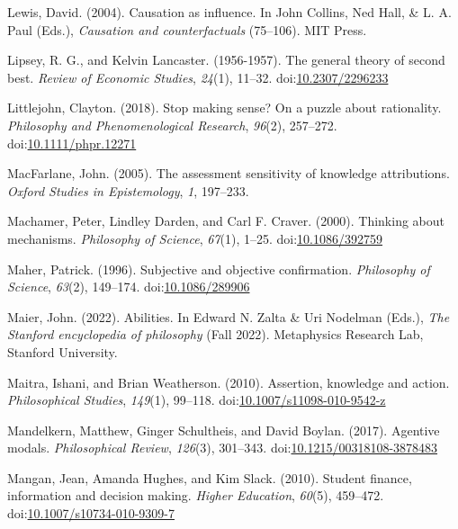 \documentclass[
  12pt,
  letterpaper,
]{scrbook}
\newlength{\cslhangindent}
\newenvironment{CSLReferences}[2] %
 {\begin{list}{}{%
  \setlength{\itemindent}{0pt}
  \setlength{\leftmargin}{0pt}
  \setlength{\parsep}{0pt}
  \ifodd #1
   \setlength{\leftmargin}{\cslhangindent}
   \setlength{\itemindent}{-1\cslhangindent}
  \fi
  \setlength{\itemsep}{#2\baselineskip}}}
 {\end{list}}
\begin{document}
\begin{CSLReferences}{1}{0}
Lewis, David. (2004). Causation as influence. In John Collins, Ned Hall,
\& L. A. Paul (Eds.), \emph{Causation and counterfactuals} (75--106).
{MIT} Press.

Lipsey, R. G., and Kelvin Lancaster. (1956-1957). The general theory of
second best. \emph{Review of Economic Studies}, \emph{24}(1), 11--32.
doi:\href{https://doi.org/10.2307/2296233}{10.2307/2296233}

Littlejohn, Clayton. (2018). Stop making sense? On a puzzle about
rationality. \emph{Philosophy and Phenomenological Research},
\emph{96}(2), 257--272.
doi:\href{https://doi.org/10.1111/phpr.12271}{10.1111/phpr.12271}

MacFarlane, John. (2005). The assessment sensitivity of knowledge
attributions. \emph{Oxford Studies in Epistemology}, \emph{1}, 197--233.

Machamer, Peter, Lindley Darden, and Carl F. Craver. (2000). Thinking
about mechanisms. \emph{Philosophy of Science}, \emph{67}(1), 1--25.
doi:\href{https://doi.org/10.1086/392759}{10.1086/392759}

Maher, Patrick. (1996). Subjective and objective confirmation.
\emph{Philosophy of Science}, \emph{63}(2), 149--174.
doi:\href{https://doi.org/10.1086/289906}{10.1086/289906}

Maier, John. (2022). {Abilities}. In Edward N. Zalta \& Uri Nodelman
(Eds.), \emph{The {Stanford} encyclopedia of philosophy} ({F}all 2022).
Metaphysics Research Lab, Stanford University.

Maitra, Ishani, and Brian Weatherson. (2010). Assertion, knowledge and
action. \emph{Philosophical Studies}, \emph{149}(1), 99--118.
doi:\href{https://doi.org/10.1007/s11098-010-9542-z}{10.1007/s11098-010-9542-z}

Mandelkern, Matthew, Ginger Schultheis, and David Boylan. (2017).
Agentive modals. \emph{Philosophical Review}, \emph{126}(3), 301--343.
doi:\href{https://doi.org/10.1215/00318108-3878483}{10.1215/00318108-3878483}

Mangan, Jean, Amanda Hughes, and Kim Slack. (2010). Student finance,
information and decision making. \emph{Higher Education}, \emph{60}(5),
459--472.
doi:\href{https://doi.org/10.1007/s10734-010-9309-7}{10.1007/s10734-010-9309-7}


\end{CSLReferences}
\end{document}
